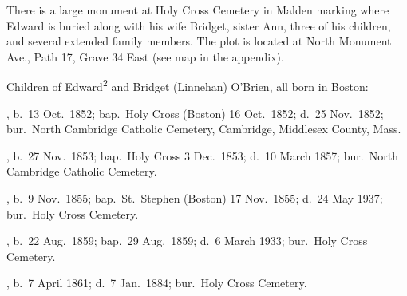 There is a large monument at Holy Cross Cemetery in Malden marking where Edward is buried along with his wife Bridget, sister Ann, three of his children, and several extended family members. The plot is located at North Monument Ave., Path 17, Grave 34 East (see map in the appendix).\cite{Edward2OBrienGrave,CarolGordon}

\begin{KidsIntro}
	Children of Edward\textsuperscript{2} and Bridget (Linnehan) O'Brien, all born in Boston:
\end{KidsIntro}

\begin{Kids}
	, b.\ 13 Oct.\ 1852;\cite{MaryAnn3OBrienBirth} bap.\ Holy Cross (Boston) 16 Oct.\ 1852;\cite{MaryAnn3OBrienBaptism} d.\ 25 Nov.\ 1852;\cite{MaryAnn3OBrienDeath} bur.\ North Cambridge Catholic Cemetery, Cambridge, Middlesex County, Mass.\cite{DianaBerberenaLetter1}
	
	, b.\ 27 Nov.\ 1853;\cite{Ellen3OBrienBirth} bap.\ Holy Cross 3 Dec.\ 1853;\cite{Ellen3OBrienBaptism} d.\ 10 March 1857;\cite{Ellen3OBrienDeath} bur.\ North Cambridge Catholic Cemetery.\cite{DianaBerberenaLetter2}
	
	, b.\ 9 Nov.\ 1855;\cite{AnnMaria3OBrienBirth} bap.\ St.\ Stephen (Boston) 17 Nov.\ 1855\cite{AnnMaria3OBrienBaptism}; d.\ 24 May 1937;\cite{AnnMaria3OBrienDeath} bur.\ Holy Cross Cemetery.\cite{CarolGordon}
	
	, b.\ 22 Aug.\ 1859;\cite{Margaret3OBrienBaptism} bap.\ 29 Aug.\ 1859;\cite{Margaret3OBrienBaptism} d.\ 6 March 1933;\cite{Margaret3OBrienDeath} bur.\ Holy Cross Cemetery.\cite{CarolGordon}
	
	, b.\ 7 April 1861;\cite{Edward3OBrienBirth} d.\ 7 Jan.\ 1884;\cite{Edward3OBrienDeath} bur.\ Holy Cross Cemetery.\cite{CarolGordon}
\end{Kids}